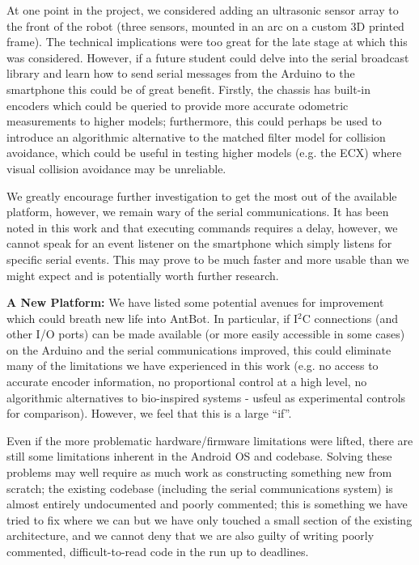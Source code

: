\documentclass[a4paper,11pt,twoside,openright]{article}
\begin{document}
At one point in the project, we considered adding an ultrasonic sensor
array to the front of the robot (three sensors, mounted in an arc on a
custom 3D printed frame). The technical implications were too great
for the late stage at which this was considered. However, if a future
student could delve into the serial broadcast library and learn how to
send serial messages from the Arduino to the smartphone this could be
of great benefit. Firstly, the chassis has built-in encoders which
could be queried to provide more accurate odometric measurements to
higher models; furthermore, this could perhaps be used to introduce an
algorithmic alternative to the matched filter model for collision
avoidance, which could be useful in testing higher models (e.g. the
ECX) where visual collision avoidance may be unreliable.
\newline\par

We greatly encourage further investigation to get the most out of the
available platform, however, we remain wary of the serial
communications. It has been noted in this work and \cite{Mitchell2018}
that executing commands requires a delay, however, we cannot speak for
an event listener on the smartphone which simply listens for specific
serial events. This may prove to be much faster and more usable than
we might expect and is potentially worth further research.\newline\par



\textbf{A New Platform:} We have listed some potential avenues for
improvement which could breath new life into AntBot. In particular, if
I$^2$C connections (and other I/O ports) can be made available (or
more easily accessible in some cases) on the Arduino and the serial
communications improved, this could eliminate many of the limitations
we have experienced in this work (e.g. no access to accurate encoder
information, no proportional control at a high level, no algorithmic
alternatives to bio-inspired systems - usfeul as experimental controls
for comparison). However, we feel that this is a large ``if''.
\newline\par

Even if the more problematic hardware/firmware limitations were lifted, there
are still some limitations inherent in the Android OS and codebase.
Solving these problems may well require as much work as constructing
something new from scratch; the existing codebase (including the
serial communications system) is almost entirely undocumented and
poorly commented; this is something we have tried to fix where we can
but we have only touched a small section of the existing architecture,
and we cannot deny that we are also guilty of writing poorly
commented, difficult-to-read code in the run up to deadlines.
\newline\par
\end{document}
